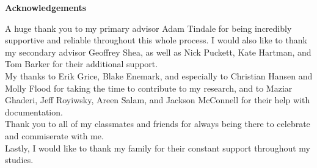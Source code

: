 \begin{center}
\large\textbf{Acknowledgements}
\end{center}

\noindent
A huge thank you to my primary advisor Adam Tindale for being incredibly supportive and reliable throughout this whole process. I would also like to thank my secondary advisor Geoffrey Shea, as well as Nick Puckett, Kate Hartman, and Tom Barker for their additional support. %
\\[0.3cm]
My thanks to Erik Grice, Blake Enemark, and especially to Christian Hansen and Molly Flood for taking the time to contribute to my research, and to Maziar Ghaderi, Jeff Royiwsky, Areen Salam, and Jackson McConnell for their help with documentation.
\\[0.3cm]
Thank you to all of my classmates and friends for always being there to celebrate and commiserate with me.
\\[0.3cm]
Lastly, I would like to thank my family for their constant support throughout my studies.


